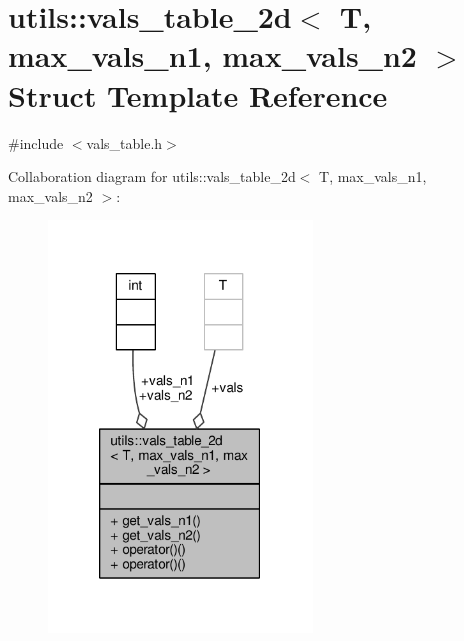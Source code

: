 \hypertarget{structutils_1_1vals__table__2d}{\section{utils\-:\-:vals\-\_\-table\-\_\-2d$<$ T, max\-\_\-vals\-\_\-n1, max\-\_\-vals\-\_\-n2 $>$ Struct Template Reference}
\label{structutils_1_1vals__table__2d}
}


{\ttfamily \#include $<$vals\-\_\-table.\-h$>$}



Collaboration diagram for utils\-:\-:vals\-\_\-table\-\_\-2d$<$ T, max\-\_\-vals\-\_\-n1, max\-\_\-vals\-\_\-n2 $>$\-:\nopagebreak
\begin{figure}[H]
\begin{center}
\leavevmode
\includegraphics[width=199pt]{structutils_1_1vals__table__2d__coll__graph}
\end{center}
\end{figure}
